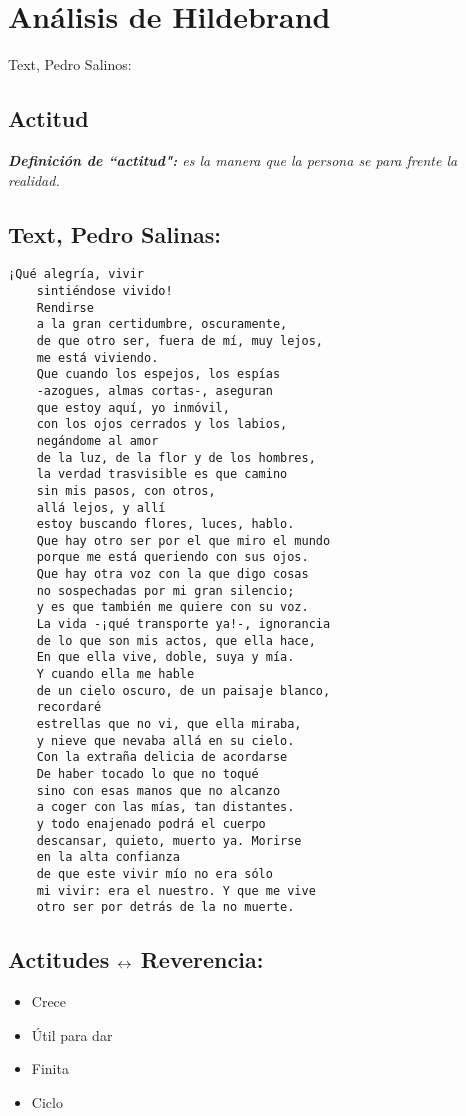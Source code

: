 \section{Análisis de Hildebrand}
Text, Pedro Salinos:
\subsection{Actitud}
\emph{\textbf{Definición de ``actitud":} es la manera que la persona se para frente la realidad.}
\subsection{Text, Pedro Salinas:}
\begin{Verbatim}[breaklines=true, breakanywhere=true]
    ¡Qué alegría, vivir
    sintiéndose vivido!
    Rendirse
    a la gran certidumbre, oscuramente,
    de que otro ser, fuera de mí, muy lejos,
    me está viviendo.
    Que cuando los espejos, los espías
    -azogues, almas cortas-, aseguran
    que estoy aquí, yo inmóvil,
    con los ojos cerrados y los labios,
    negándome al amor
    de la luz, de la flor y de los hombres,
    la verdad trasvisible es que camino
    sin mis pasos, con otros,
    allá lejos, y allí
    estoy buscando flores, luces, hablo.
    Que hay otro ser por el que miro el mundo
    porque me está queriendo con sus ojos.
    Que hay otra voz con la que digo cosas
    no sospechadas por mi gran silencio;
    y es que también me quiere con su voz.
    La vida -¡qué transporte ya!-, ignorancia
    de lo que son mis actos, que ella hace,
    En que ella vive, doble, suya y mía.
    Y cuando ella me hable
    de un cielo oscuro, de un paisaje blanco,
    recordaré
    estrellas que no vi, que ella miraba,
    y nieve que nevaba allá en su cielo.
    Con la extraña delicia de acordarse
    De haber tocado lo que no toqué
    sino con esas manos que no alcanzo
    a coger con las mías, tan distantes.
    y todo enajenado podrá el cuerpo
    descansar, quieto, muerto ya. Morirse
    en la alta confianza
    de que este vivir mío no era sólo
    mi vivir: era el nuestro. Y que me vive
    otro ser por detrás de la no muerte.
\end{Verbatim}

\subsection{Actitudes $\leftrightarrow$ Reverencia:}
\begin{itemize}
    \item Crece 
    \item Útil para dar 
    \item Finita 
    \item Ciclo 
\end{itemize} 




